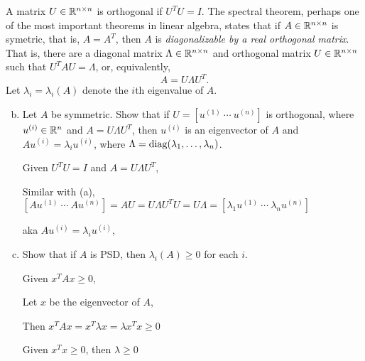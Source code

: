   A matrix $U \in \mathbb{R}^{n \times n}$ is orthogonal if $U^T U = I$.
  The spectral theorem, perhaps one of the most important theorems in
  linear algebra, states that if $A \in \mathbb{R}^{n \times n}$ is symetric,
  that is, $A= A^T$,
  then $A$ is \emph{diagonalizable by a real orthogonal matrix}. That is,
  there are a diagonal matrix $\Lambda \in \mathbb{R}^{n \times n}$ and
  orthogonal matrix $U \in \mathbb{R}^{n \times n}$ such that
  $U^T A U = \Lambda$, or, equivalently,
  \begin{equation*}
    A = U \Lambda U^T.
  \end{equation*}
  Let $\lambda_i = \lambda_i(A)$ denote the $i$th eigenvalue of $A$.
  \begin{enumerate}[(a)]
    \setcounter{enumii}{1}
  \item Let $A$ be symmetric. Show that if $U = [u^{(1)} ~ \cdots ~ u^{(n)}]$
    is orthogonal,
    where $u^{(i)} \in \mathbb{R}^n$ and $A = U \Lambda U^T$, then
    $u^{(i)}$ is an eigenvector of $A$ and
    $A u^{(i)} = \lambda_i u^{(i)}$, where
    $\Lambda = \mathop{\rm diag}(\lambda_1, \ldots, \lambda_n)$.

    Given $U^T U = I$ and $A = U \Lambda U^T$, 

    Similar with (a), $[A u^{(1)} ~ \cdots ~ A u^{(n)}] = A U = U \Lambda U^T U = U \Lambda = [\lambda_1 u^{(1)} ~ \cdots ~ \lambda_n u^{(n)}]$

    aka $A u^{(i)} = \lambda_i u^{(i)}$,
  \item Show that if $A$ is PSD, then $\lambda_i(A) \ge 0$ for each $i$.

  Given $x^T A x \ge 0$,

  Let $x$ be the eigenvector of $A$,

  Then $x^T A x = x ^T \lambda x = \lambda x ^T x \ge 0$

  Given $x ^ T x \ge 0$, then $\lambda \ge 0$ 

  \end{enumerate}
  
